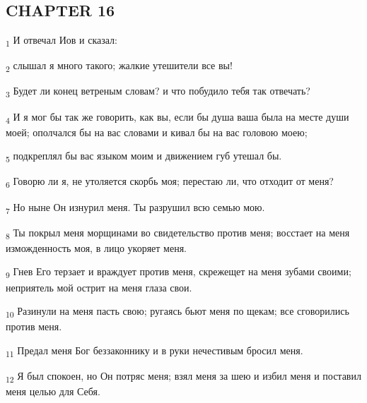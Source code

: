 \subsection{CHAPTER 16}
\begin{tcolorbox}
\textsubscript{1} И отвечал Иов и сказал:
\end{tcolorbox}
\begin{tcolorbox}
\textsubscript{2} слышал я много такого; жалкие утешители все вы!
\end{tcolorbox}
\begin{tcolorbox}
\textsubscript{3} Будет ли конец ветреным словам? и что побудило тебя так отвечать?
\end{tcolorbox}
\begin{tcolorbox}
\textsubscript{4} И я мог бы так же говорить, как вы, если бы душа ваша была на месте души моей; ополчался бы на вас словами и кивал бы на вас головою моею;
\end{tcolorbox}
\begin{tcolorbox}
\textsubscript{5} подкреплял бы вас языком моим и движением губ утешал бы.
\end{tcolorbox}
\begin{tcolorbox}
\textsubscript{6} Говорю ли я, не утоляется скорбь моя; перестаю ли, что отходит от меня?
\end{tcolorbox}
\begin{tcolorbox}
\textsubscript{7} Но ныне Он изнурил меня. Ты разрушил всю семью мою.
\end{tcolorbox}
\begin{tcolorbox}
\textsubscript{8} Ты покрыл меня морщинами во свидетельство против меня; восстает на меня изможденность моя, в лицо укоряет меня.
\end{tcolorbox}
\begin{tcolorbox}
\textsubscript{9} Гнев Его терзает и враждует против меня, скрежещет на меня зубами своими; неприятель мой острит на меня глаза свои.
\end{tcolorbox}
\begin{tcolorbox}
\textsubscript{10} Разинули на меня пасть свою; ругаясь бьют меня по щекам; все сговорились против меня.
\end{tcolorbox}
\begin{tcolorbox}
\textsubscript{11} Предал меня Бог беззаконнику и в руки нечестивым бросил меня.
\end{tcolorbox}
\begin{tcolorbox}
\textsubscript{12} Я был спокоен, но Он потряс меня; взял меня за шею и избил меня и поставил меня целью для Себя.
\end{tcolorbox}
